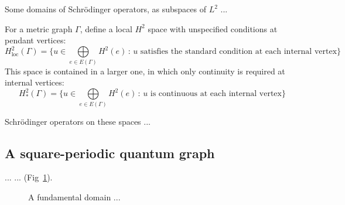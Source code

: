 \documentclass[12pt]{article}
\newcommand{\Hloc}{H^2_\text{loc}}
\newcommand{\Hstar}{H^2_*}
\begin{document}
Some domains of Schr\"odinger operators, as subspaces of $L^2$ ...

For a metric graph $\Gamma$, define a local $H^2$ space with unspecified conditions at pendant vertices:
%
\begin{equation}
  \Hloc(\Gamma) = \big\{ u\in \bigoplus\limits_{e\in E(\Gamma)} H^2(e)
                                    \,:\,  \text{$u$ satisfies the standard condition at each internal vertex}  \big\}
\end{equation}
%
This space is contained in a larger one, in which only continuity is required at internal vertices:
%
\begin{equation}
  \Hstar(\Gamma) = \big\{ u\in \bigoplus\limits_{e\in E(\Gamma)} H^2(e)
                                    \,:\,  \text{$u$ is continuous at each internal vertex}  \big\}
\end{equation}
%


Schr\"odinger operators on these spaces ...



\subsection{A square-periodic quantum graph}

... ... (Fig~\ref{fig:FundamentalDomain}).

\begin{figure}  %
\centerline{}
\caption{\small A fundamental domain ...}
\label{fig:FundamentalDomain}
\end{figure}
\end{document}
